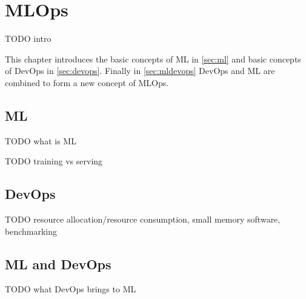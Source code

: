 \chapter{MLOps}

TODO intro

This chapter introduces the basic concepts of ML in \autoref{sec:ml} and basic concepts of DevOps in \autoref{sec:devops}. Finally in \autoref{sec:mldevops} DevOps and ML are combined to form a new concept of MLOps.

\section{ML}
\label{sec:ml}

TODO what is ML

TODO training vs serving

\section{DevOps}
\label{sec:devops}

TODO resource allocation/resource consumption, small memory software, benchmarking

\section{ML and DevOps}
\label{sec:mldevops}

TODO what DevOps brings to ML

